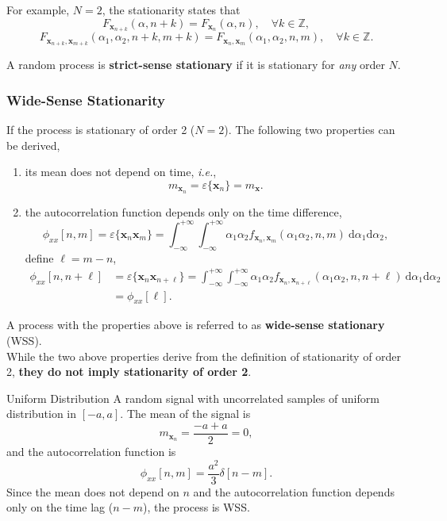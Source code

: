 For example, $N=2$, the stationarity states that 
\[
    F_{\mathbf{x}_{n+k}}(\alpha, n+k) = F_{\mathbf{x}_{n}}(\alpha, n), \quad \forall k \in \mathbb{Z},
\]
\[
    F_{\mathbf{x}_{n+k}, \mathbf{x}_{m+k}}(\alpha_1, \alpha_2, n+k, m+k) = F_{\mathbf{x}_{n}, \mathbf{x}_{m}}(\alpha_1, \alpha_2, n, m), \quad \forall k \in \mathbb{Z}.
\]

A random process is \textbf{strict-sense stationary} if it is stationary for \textit{any} order $N$.

\subsubsection{Wide-Sense Stationarity}
If the process is stationary of order 2 ($N=2$). The following two properties can be derived,
\begin{enumerate}
    \item its mean does not depend on time, \textit{i.e.},
        \[
            m_{\mathbf{x}_n} = \varepsilon\{\mathbf{x}_n\} = m_{\mathbf{x}}.
        \]
    \item the autocorrelation function depends only on the time difference, 
        \[
            \phi_{xx}[n, m] = \varepsilon\{ \mathbf{x}_n \mathbf{x}_m \} = \int_{-\infty}^{+\infty} \int_{-\infty}^{+\infty} \alpha_1 \alpha_2 f_{\mathbf{x}_n, \mathbf{x}_m} (\alpha_1 \alpha_2, n, m) \ \mathrm{d}\alpha_1 \mathrm{d}\alpha_2,
        \]
        define $\ell = m-n$, 
        \begin{align*}
            \phi_{xx}[n, n+\ell]
            & = \varepsilon\{ \mathbf{x}_n \mathbf{x}_{n+\ell} \} = \int_{-\infty}^{+\infty} \int_{-\infty}^{+\infty} \alpha_1 \alpha_2 f_{\mathbf{x}_n, \mathbf{x}_{n+\ell}} (\alpha_1 \alpha_2, n, {n+\ell}) \ \mathrm{d}\alpha_1 \mathrm{d}\alpha_2\\
            & = \phi_{xx}[\ell].
        \end{align*}
\end{enumerate}
A process with the properties above is referred to as \textbf{wide-sense stationary} (WSS).\\

While the two above properties derive from the definition of stationarity of order 2, \textbf{they do not imply stationarity of order 2}.

\begin{ex}{Uniform Distribution}
A random signal with uncorrelated samples of uniform distribution in $[−a, a]$. The mean of the signal is
\[
    m_{\mathbf{x}_n} = \frac{-a + a}{2} = 0,
\]
and the autocorrelation function is
\[
    \phi_{xx}[n,m] = \frac{a^2}{3} \delta[n-m].
\]
Since the mean does not depend on $n$ and the autocorrelation function depends only on the time lag ($n-m$), the process is WSS.
\end{ex}

